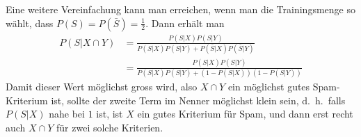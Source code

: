 Eine weitere Vereinfachung kann man erreichen, wenn man die Trainingsmenge so
wählt, dass $P(S)=P(\bar S)=\frac12$.
Dann erhält man
\begin{align}
P(S|X\cap Y)
&=
\frac{P(S|X)P(S|Y)}{P(S|X)P(S|Y)+P(\bar S|X)P(\bar S|Y)}\nonumber
\\
&=
\frac{P(S|X)P(S|Y)}{P(S|X)P(S|Y)+(1-P(S|X))(1-P(S|Y))}
\end{align}
Damit dieser Wert möglichst gross wird, also $X\cap Y$ ein möglichst
gutes Spam-Kriterium ist, sollte der zweite Term im Nenner möglichst klein
sein, d.~h.~falls $P(S|X)$ nahe bei $1$ ist, ist $X$ ein gutes Kriterium für
Spam, und dann erst recht auch $X\cap Y$ für zwei solche Kriterien.
